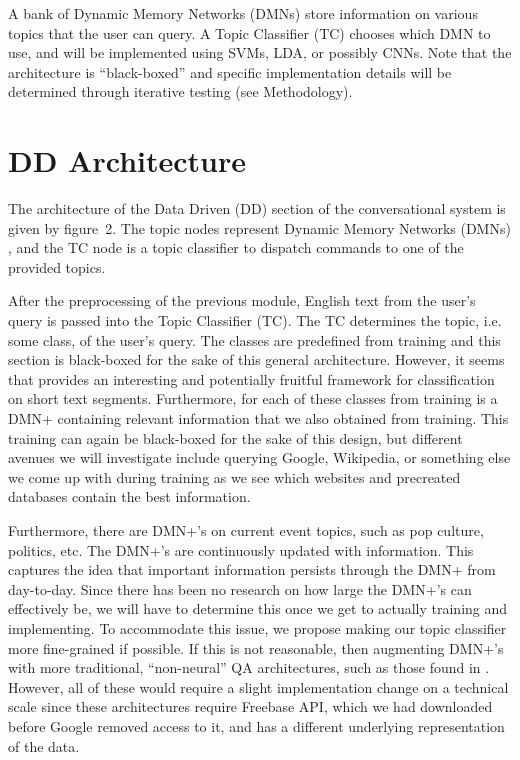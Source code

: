 \documentclass[10pt,twoside,twocolumn]{article}
\begin{document}
\noindent
A bank of Dynamic Memory Networks (DMNs) \cite{Kumar:2015, Xiong2016} store information on various topics that the user can query. A Topic Classifier (TC) chooses which DMN to use, and will be implemented using SVMs\cite{Joachims1998, Pilaszy2005}, LDA\cite{Blei2001, Zhao2011}, or possibly CNNs\cite{Kim2014}. Note that the architecture is ``black-boxed'' and specific implementation details will be determined through iterative testing (see Methodology).

\section{DD Architecture}
The architecture of the Data Driven (DD) section of the conversational system is given by figure~2. The topic nodes represent Dynamic Memory Networks (DMNs) \cite{Kumar:2015, Xiong2016}, and the TC node is a topic classifier to dispatch commands to one of the provided topics.

\noindent
After the preprocessing of the previous module, English text from the user's query is passed into the Topic Classifier (TC). The TC determines the topic, i.e. some class, of the user's query. The classes are predefined from training and this section is black-boxed for the sake of this general architecture. However, it seems that \cite{Zhao2011} provides an interesting and potentially fruitful framework for classification on short text segments. Furthermore, for each of these classes from training is a DMN+ \cite{Xiong2016} containing relevant information that we also obtained from training. This training can again be black-boxed for the sake of this design, but different avenues we will investigate include querying Google, Wikipedia, or something else we come up with during training as we see which websites and precreated databases contain the best information.

\noindent
Furthermore, there are DMN+'s on current event topics, such as pop culture, politics, etc. The DMN+'s are continuously updated with information. This captures the idea that important information persists through the DMN+ from day-to-day. Since there has been no research on how large the DMN+'s can effectively be, we will have to determine this once we get to actually training and implementing. To accommodate this issue, we propose making our topic classifier more fine-grained if possible. If this is not reasonable, then augmenting DMN+'s with more traditional, ``non-neural'' QA architectures, such as those found in \cite{Iyyer2014, Yao2014a, Yao2014b}. However, all of these would require a slight implementation change on a technical scale since these architectures require Freebase API, which we had downloaded before Google removed access to it, and has a different underlying representation of the data.
\end{document}
